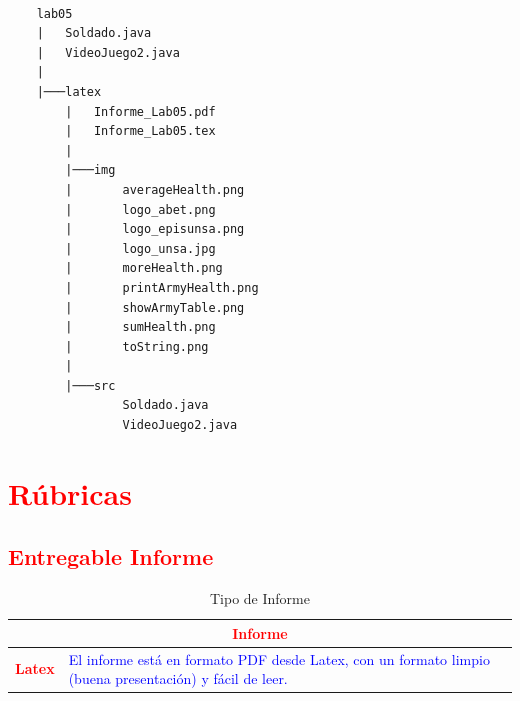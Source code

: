 \documentclass{article}
\begin{document}
\begin{lstlisting}[style=ascii-tree]

    lab05
    |   Soldado.java
    |   VideoJuego2.java
    |
    |───latex
        |   Informe_Lab05.pdf
        |   Informe_Lab05.tex
        |
        |───img
        |       averageHealth.png
        |       logo_abet.png
        |       logo_episunsa.png
        |       logo_unsa.jpg
        |       moreHealth.png
        |       printArmyHealth.png
        |       showArmyTable.png
        |       sumHealth.png
        |       toString.png
        |
        |───src
                Soldado.java
                VideoJuego2.java

\end{lstlisting}    

	\section{\textcolor{red}{Rúbricas}}
	
	\subsection{\textcolor{red}{Entregable Informe}}
	\begin{table}[H]
		\caption{Tipo de Informe}
		\setlength{\tabcolsep}{0.5em} %
		{\renewcommand{\arraystretch}{1.5} %
		\begin{tabular}{|p{3cm}|p{12cm}|}
			\hline
			\multicolumn{2}{|c|}{\textbf{\textcolor{red}{Informe}}}  \\
			\hline 
			\textbf{\textcolor{red}{Latex}} & \textcolor{blue}{El informe está en formato PDF desde Latex,  con un formato limpio (buena presentación) y fácil de leer.}   \\ 
			\hline 
			
			
		\end{tabular}
	}
	\end{table}
	
	\clearpage
 
\end{document}
